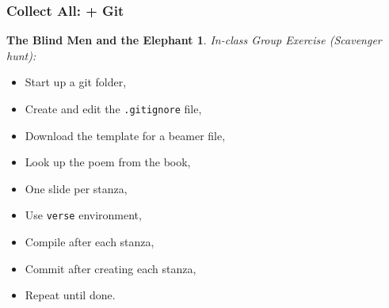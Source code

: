 \newtheorem{POEMbender}{The Blind Men and the Elephant}
\begin{frame}[fragile]
    \frametitle{Collect All: \LaTeXs + Git}
    \begin{POEMbender}
        In-class Group Exercise (Scavenger hunt):
    \end{POEMbender}
        \begin{itemize}
            \item Start up a git folder,
            \item Create and edit the \texttt{.gitignore} file,
            \item Download the template for a beamer file,
            \item Look up the poem from the book,
            \item One slide per stanza,
            \item Use \texttt{verse} environment,
            \item Compile after each stanza,
            \item Commit after creating each stanza,
            \item Repeat until done.
        \end{itemize}
\end{frame}
